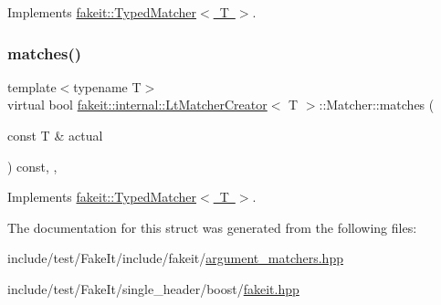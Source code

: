 Implements \mbox{\hyperlink{structfakeit_1_1TypedMatcher_ac553bb6ac7c98a489c92fa6ace0f2e2b}{fakeit\+::\+Typed\+Matcher$<$ T $>$}}.

\mbox{\label{structfakeit_1_1internal_1_1LtMatcherCreator_1_1Matcher_a0c1ba926c3b7b8f3aa1db50a55aa1a1d}} 
\subsubsection{\texorpdfstring{matches()}{matches()}\hspace{0.1cm}{\footnotesize\ttfamily [9/9]}}
{\footnotesize\ttfamily template$<$typename T$>$ \\
virtual bool \mbox{\hyperlink{structfakeit_1_1internal_1_1LtMatcherCreator}{fakeit\+::internal\+::\+Lt\+Matcher\+Creator}}$<$ T $>$\+::Matcher\+::matches (\begin{DoxyParamCaption}\item[{const T \&}]{actual }\end{DoxyParamCaption}) const\hspace{0.3cm}{\ttfamily [inline]}, {\ttfamily [override]}, {\ttfamily [virtual]}}



Implements \mbox{\hyperlink{structfakeit_1_1TypedMatcher_ac553bb6ac7c98a489c92fa6ace0f2e2b}{fakeit\+::\+Typed\+Matcher$<$ T $>$}}.



The documentation for this struct was generated from the following files\+:\begin{DoxyCompactItemize}
\item 
include/test/\+Fake\+It/include/fakeit/\mbox{\hyperlink{argument__matchers_8hpp}{argument\+\_\+matchers.\+hpp}}\item 
include/test/\+Fake\+It/single\+\_\+header/boost/\mbox{\hyperlink{single__header_2boost_2fakeit_8hpp}{fakeit.\+hpp}}\end{DoxyCompactItemize}
